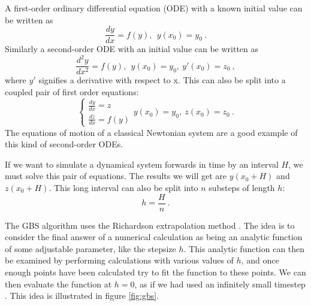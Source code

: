\documentclass[english, oneside]{HYgradu}
\begin{document}
A first-order ordinary differential equation (ODE) with a known initial value can be written as 
\begin{equation}
\frac{dy}{dx} = f(y), \ \ y(x_0) = y_0 \ .
\end{equation}
Similarly a second-order ODE with an initial value can be written as
\begin{equation}
\frac{d^2 y}{dx^2} = f(y), \ \ y(x_0) = y_0, \ y'(x_0) = z_0 \ ,
\end{equation}
where $y'$ signifies a derivative with respect to x. This can also be split into a coupled pair of first order equations:
\begin{equation}
\begin{cases}
\frac{dy}{dx} = z \\
\frac{dz}{dx} = f(y)
\end{cases}
y(x_0) = y_0, \ z(x_0) = z_0 \ .
\end{equation}
The equations of motion of a classical Newtonian system are a good example of this kind of second-order ODEs. 

If we want to simulate a dynamical system forwards in time by an interval $H$, we must solve this pair of equations. The results we will get are $y(x_0 + H)$ and $z(x_0 + H)$. This long interval can also be split into $n$ substeps of length $h$:
\begin{equation}
h = \frac{H}{n} \ .
\end{equation}

The GBS algorithm uses the Richardson extrapolation method \citep{richardson:1911,richardson:1927}. The idea is to consider the final answer of a numerical calculation as being an analytic function of some adjustable parameter, like the stepsize $h$. This analytic function can then be examined by performing calculations with various values of $h$, and once enough points have been calculated try to fit the function to these points. We can then evaluate the function at $h=0$, as if we had used an infinitely small timestep \citep{press:2007}. This idea is illustrated in figure \ref{fig:gbs}.
\end{document}

